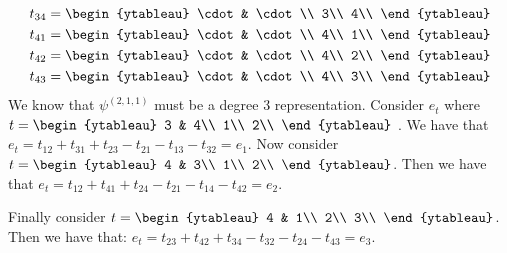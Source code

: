 \documentclass[]{article}
\begin{document}
\begin{align*}
	t_{34} &= \begin{ytableau}
	\cdot & \cdot\\
	3\\
	4\\
\end{ytableau}\\
	t_{41} &= \begin{ytableau}
	\cdot & \cdot\\
	4\\
	1\\
\end{ytableau}\\
	t_{42} &= \begin{ytableau}
	\cdot & \cdot\\
	4\\
	2\\
\end{ytableau}\\
	t_{43} &= \begin{ytableau}
	\cdot & \cdot\\
	4\\
	3\\
\end{ytableau}
\end{align*}
We know that $\psi^{(2,1,1)}$ must be a degree 3 representation.
Consider $e_t$ where $t = 
\begin{ytableau}
3 & 4\\
1\\
2\\
\end{ytableau} 
$
. We have that $e_t = t_{12} + t_{31} + t_{23} - t_{21} - t_{13} - t_{32} = e_1$. 
Now consider
$t = 
\begin{ytableau}
	4 & 3\\
	1\\
	2\\
\end{ytableau} 
$. Then we have that
$e_t = t_{12} + t_{41} + t_{24} - t_{21} - t_{14} - t_{42} = e_2$. 

Finally consider
$t = 
\begin{ytableau}
	4 & 1\\
	2\\
	3\\
\end{ytableau} 
$. 
Then we have that:
$e_t = t_{23} + t_{42} + t_{34} - t_{32} - t_{24} - t_{43} = e_3$.
\end{document}
